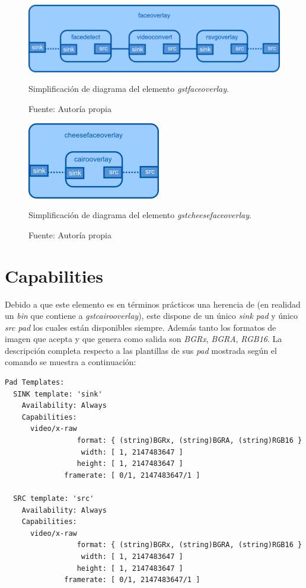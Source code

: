 \documentclass[a4paper,openright,12pt]{report}
\begin{document}
\begin{figure}[!h]
  \centering
    \includegraphics[width=1.0\textwidth]{../images/faceoverlay-design.png}\par
  \caption{Simplificación de diagrama del elemento \textit{gstfaceoverlay}.}
    \label{fig:faceoverlay-design}
  \caption*{Fuente: Autoría propia}
\end{figure}

\begin{figure}[!h]
  \centering
    \includegraphics{../images/cheesefaceoverlay-design.png}\par
  \caption{Simplificación de diagrama del elemento \textit{gstcheesefaceoverlay}.}
    \label{fig:cheesefaceoverlay-design}
  \caption*{Fuente: Autoría propia}
\end{figure}

\section{Capabilities}
Debido a que este elemento es en términos prácticos una herencia de (en realidad
un \textit{bin} que contiene a \textit{\gls{gstcairooverlay}}), este dispone de
un único \textit{sink pad} y único \textit{src pad} los cuales están disponibles
siempre. Además tanto los formatos de imagen que acepta y que genera como salida
son \textit{BGRx}, \textit{BGRA}, \textit{RGB16}. La descripción completa
respecto a las plantillas de sus \textit{pad} mostrada según el comando
 se muestra a continuación:

\begin{verbatim}
Pad Templates:
  SINK template: 'sink'
    Availability: Always
    Capabilities:
      video/x-raw
                 format: { (string)BGRx, (string)BGRA, (string)RGB16 }
                  width: [ 1, 2147483647 ]
                 height: [ 1, 2147483647 ]
              framerate: [ 0/1, 2147483647/1 ]
  
  SRC template: 'src'
    Availability: Always
    Capabilities:
      video/x-raw
                 format: { (string)BGRx, (string)BGRA, (string)RGB16 }
                  width: [ 1, 2147483647 ]
                 height: [ 1, 2147483647 ]
              framerate: [ 0/1, 2147483647/1 ]
\end{verbatim}
\end{document}
